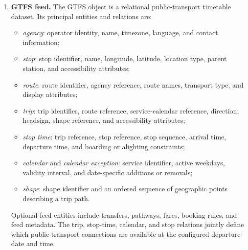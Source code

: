\begin{enumerate}
    \item \textbf{GTFS feed.}
    The GTFS object is a relational public-transport timetable dataset. Its
    principal entities and relations are:
    \begin{itemize}
        \item \emph{agency}: operator identity, name, timezone, language, and
        contact information;
        \item \emph{stop}: stop identifier, name, longitude, latitude, location
        type, parent station, and accessibility attributes;
        \item \emph{route}: route identifier, agency reference, route names,
        transport type, and display attributes;
        \item \emph{trip}: trip identifier, route reference, service-calendar
        reference, direction, headsign, shape reference, and accessibility
        attributes;
        \item \emph{stop time}: trip reference, stop reference, stop sequence,
        arrival time, departure time, and boarding or alighting constraints;
        \item \emph{calendar} and \emph{calendar exception}: service identifier,
        active weekdays, validity interval, and date-specific additions or
        removals;
        \item \emph{shape}: shape identifier and an ordered sequence of
        geographic points describing a trip path.
    \end{itemize}
    Optional feed entities include transfers, pathways, fares, booking rules,
    and feed metadata. The trip, stop-time, calendar, and stop relations jointly
    define which public-transport connections are available at the configured
    departure date and time.
\end{enumerate}

